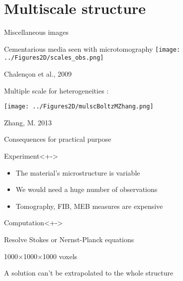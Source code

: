 \section{Multiscale structure}

\begin{frame}{Miscellaneous images}%
%
\begin{multicols}{2}
Cementarious media seen with microtomography
%
\texttt{[image: ../Figures2D/scales\_obs.png]}

\par
\tiny
Chalen\c con et al., 2009
\normalsize

\columnbreak
Multiple scale for heterogeneities : 

\texttt{[image: ../Figures2D/mulscBoltzMZhang.png]}

\par
\tiny
Zhang, M. 2013
\normalsize
\end{multicols}
%
%
\end{frame}

\begin{frame}{Consequences for practical purpose}
%
\begin{block}{Experiment}<+->
\begin{itemize}
\item<+-> The material's microstructure is variable
\item<+-> We would need a huge number of observations
\item<+-> Tomography, FIB, MEB measures are expensive
\end{itemize}
\end{block}
%
\begin{block}{Computation}<+->
\begin{description}
\item<+-> [Objectives] Resolve Stokes or Nernst-Planck equations
\item<+-> [High spatial resolution] 1000$\times$1000$\times$1000 voxels
\item<+-> [Small sample] A solution can't be extrapolated to the whole structure
\end{description}
\end{block}
%
\end{frame}